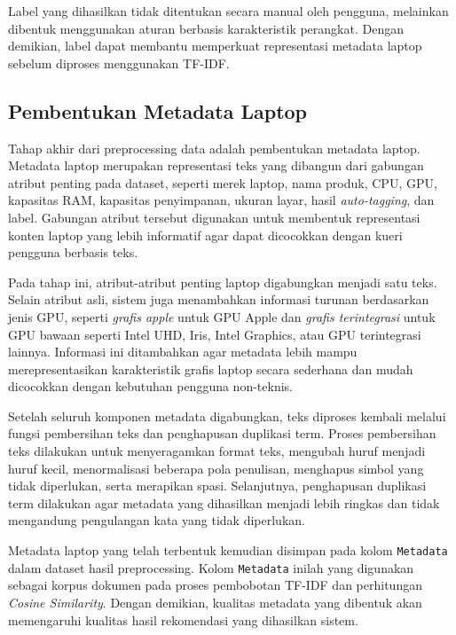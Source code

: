 Label yang dihasilkan tidak ditentukan secara manual oleh pengguna, melainkan dibentuk menggunakan aturan berbasis karakteristik perangkat. Dengan demikian, label dapat membantu memperkuat representasi metadata laptop sebelum diproses menggunakan TF-IDF.

\subsection{Pembentukan Metadata Laptop}
Tahap akhir dari preprocessing data adalah pembentukan metadata laptop. Metadata laptop merupakan representasi teks yang dibangun dari gabungan atribut penting pada dataset, seperti merek laptop, nama produk, CPU, GPU, kapasitas RAM, kapasitas penyimpanan, ukuran layar, hasil \textit{auto-tagging}, dan label. Gabungan atribut tersebut digunakan untuk membentuk representasi konten laptop yang lebih informatif agar dapat dicocokkan dengan kueri pengguna berbasis teks.

Pada tahap ini, atribut-atribut penting laptop digabungkan menjadi satu teks. Selain atribut asli, sistem juga menambahkan informasi turunan berdasarkan jenis GPU, seperti \textit{grafis apple} untuk GPU Apple dan \textit{grafis terintegrasi} untuk GPU bawaan seperti Intel UHD, Iris, Intel Graphics, atau GPU terintegrasi lainnya. Informasi ini ditambahkan agar metadata lebih mampu merepresentasikan karakteristik grafis laptop secara sederhana dan mudah dicocokkan dengan kebutuhan pengguna non-teknis.

Setelah seluruh komponen metadata digabungkan, teks diproses kembali melalui fungsi pembersihan teks dan penghapusan duplikasi term. Proses pembersihan teks dilakukan untuk menyeragamkan format teks, mengubah huruf menjadi huruf kecil, menormalisasi beberapa pola penulisan, menghapus simbol yang tidak diperlukan, serta merapikan spasi. Selanjutnya, penghapusan duplikasi term dilakukan agar metadata yang dihasilkan menjadi lebih ringkas dan tidak mengandung pengulangan kata yang tidak diperlukan.

Metadata laptop yang telah terbentuk kemudian disimpan pada kolom \texttt{Metadata} dalam dataset hasil preprocessing. Kolom \texttt{Metadata} inilah yang digunakan sebagai korpus dokumen pada proses pembobotan TF-IDF dan perhitungan \textit{Cosine Similarity}. Dengan demikian, kualitas metadata yang dibentuk akan memengaruhi kualitas hasil rekomendasi yang dihasilkan sistem.

